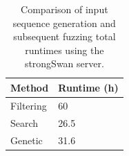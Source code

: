 \vspace{5mm}
\begin{table}[h]
	\centering
	\begin{tabular}{|l|l|}
		\hline
		\rowcolor[HTML]{EFEFEF} 
		\textbf{Method} & \textbf{Runtime (h)}   \\ \hline
		Filtering		            &  60	     \\ \hline
		Search              		&  26.5      \\ \hline
		Genetic              		&  31.6       \\ \hline
	\end{tabular}
	\caption{Comparison of input sequence generation and subsequent fuzzing total runtimes using the strongSwan server.}
	\label{tab:compfull}
\end{table}
\cleardoublepage